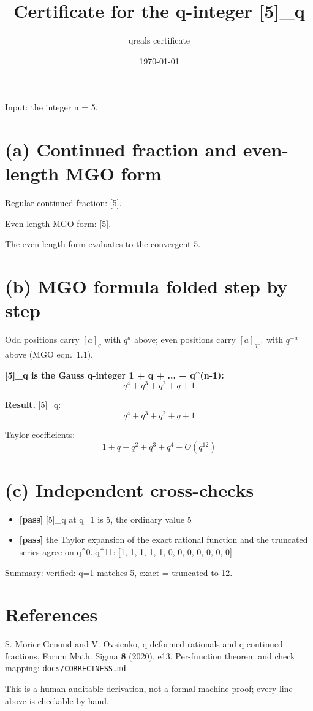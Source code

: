 \documentclass[11pt]{article}
\title{Certificate for the q-integer [5]\_q}
\author{qreals certificate}
\date{\today}
\begin{document}
\maketitle

\noindent Input: the integer n = 5.

\section*{(a) Continued fraction and even-length MGO form}
Regular continued fraction: [5]. \par
Even-length MGO form: [5]. \par
The even-length form evaluates to the convergent $ 5 $.\par

\section*{(b) MGO formula folded step by step}
Odd positions carry $[a]_q$ with $q^a$ above; even positions carry
$[a]_{q^{-1}}$ with $q^{-a}$ above (MGO eqn.~1.1).

\noindent\textbf{[5]\_q is the Gauss q-integer 1 + q + ... + q\textasciicircum{}(n-1):}
{\footnotesize%
\begin{dmath*}
q^{4} + q^{3} + q^{2} + q + 1
\end{dmath*}
}

\noindent\textbf{Result.} [5]\_q:
{\footnotesize%
\begin{dmath*}
q^{4} + q^{3} + q^{2} + q + 1
\end{dmath*}
}

\noindent Taylor coefficients:
{\small%
\begin{dmath*}
1 + q + q^{2} + q^{3} + q^{4} + O(q^{12})
\end{dmath*}
}

\section*{(c) Independent cross-checks}
\begin{itemize}
\item \textbf{[pass]} [5]\_q at q=1 is 5, the ordinary value 5
\item \textbf{[pass]} the Taylor expansion of the exact rational function and the truncated series agree on q\textasciicircum{}0..q\textasciicircum{}11: [1, 1, 1, 1, 1, 0, 0, 0, 0, 0, 0, 0]
\end{itemize}
Summary: verified: q=1 matches 5, exact = truncated to 12.

\section*{References}
S. Morier-Genoud and V. Ovsienko, q-deformed rationals and q-continued
fractions, Forum Math. Sigma \textbf{8} (2020), e13. Per-function theorem and
check mapping: \texttt{docs/CORRECTNESS.md}.

\medskip
\noindent This is a human-auditable derivation, not a formal machine proof;
every line above is checkable by hand.
\end{document}

